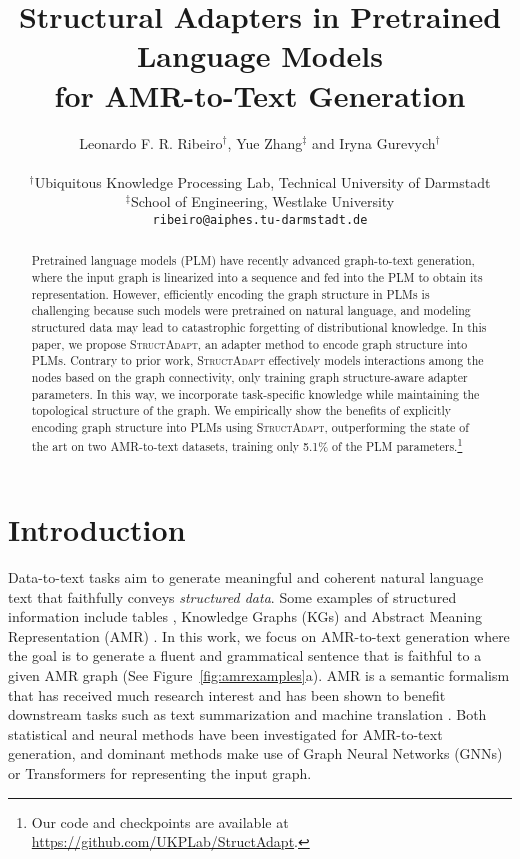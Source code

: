 \documentclass[11pt]{article}
\title{Structural Adapters in Pretrained Language Models \\ for AMR-to-Text Generation}
\author{Leonardo F. R. Ribeiro$^{\dag}$, Yue Zhang$^{\ddag}$ and Iryna Gurevych$^{\dag}$ \vspace{1mm} \\
\rule{0pt}{2.5ex}
  $^{\dag}$Ubiquitous Knowledge Processing Lab, Technical University of Darmstadt\\
  $^{\ddag}$School of Engineering, Westlake University \\
 \texttt{ribeiro@aiphes.tu-darmstadt.de}
}
\newcommand\ftnote[1]{\footnote{\raggedright#1}}
\newcommand{\graphadapter}{{\small\textsc{StructAdapt}}\xspace}
\begin{document}
\maketitle
\begin{abstract}

Pretrained language models (PLM) have recently advanced graph-to-text generation, where the input graph is linearized into a sequence and fed into the PLM to obtain its representation. However, efficiently encoding the graph structure in PLMs is challenging because such models were pretrained on natural language, and modeling structured data may lead to catastrophic forgetting of distributional knowledge. In this paper, we propose \graphadapter, an adapter method to encode graph structure into PLMs. Contrary to prior work, \graphadapter effectively models interactions among the nodes based on the graph connectivity, only training graph structure-aware adapter parameters. In this way, we incorporate task-specific knowledge while maintaining the topological structure of the graph. We empirically show the benefits of explicitly encoding graph structure into PLMs using \graphadapter, outperforming the state of the art on two AMR-to-text datasets, training only 5.1\% of the PLM parameters.\ftnote{Our code and checkpoints are available at \href{https://github.com/UKPLab/StructAdapt}{https://github.com/UKPLab/StructAdapt}.}
\end{abstract}

\section{Introduction}

Data-to-text tasks aim to generate meaningful and coherent natural language text that faithfully conveys \emph{structured data}. Some examples of structured information include tables \cite{parikh-etal-2020-totto}, Knowledge Graphs (KGs) \cite{gardent-etal-2017-webnlg, VOUGIOUKLIS20181} and Abstract Meaning Representation (AMR) \cite{banarescu-etal-2013-abstract}. In this work, we focus on AMR-to-text generation where the goal is to generate a fluent and grammatical sentence that is faithful to a given AMR graph (See Figure~\ref{fig:amrexamples}a). AMR is a semantic formalism that has received much research interest \cite{song-etal-2018-graph, doi:10.116200269, ribeiro-etal-2019-enhancing, opitz-etal-2020-amr, bamboo, fu-etal-2021-end} and has been shown to benefit downstream tasks such as text summarization \cite{liao-etal-2018-abstract} and machine translation \cite{doi:10.116200252}.  Both statistical \cite{flanigan-etal-2016-generation, pourdamghani-etal-2016-generating} and neural methods \cite{bai-etal-2020-online,cai-lam-2020-graph} have been investigated for AMR-to-text generation, and dominant methods make use of Graph Neural Networks (GNNs) \cite{Kipf:2016tc} or Transformers \cite{NIPS2017_7181} for representing the input graph.
\end{document}
